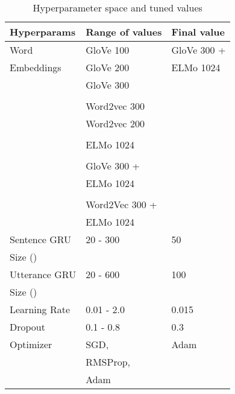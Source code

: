 \documentclass[11pt,a4paper]{article}
\begin{document}
\begin{table}[h]
\centering
\small 
\begin{tabular}{lll}
\hline \bf Hyperparams & \bf Range of values & \bf Final value \\ \hline
\hline
Word & GloVe 100 & GloVe 300 + \\ 
Embeddings & GloVe 200 & \hspace{3pt} ELMo 1024 \\
	& GloVe 300 \vspace{-5pt} & \\
	& \hrulefill \\
	& Word2vec 300 & \\
	& Word2vec 200 \vspace{-5pt} & \\
	& \hrulefill \\
	& ELMo 1024 \vspace{-5pt} & \\
	& \hrulefill \\
	& GloVe 300 + \\
	& \hspace{3pt} ELMo 1024 \vspace{-5pt} & \\
	& \hrulefill \\
	& Word2Vec 300 + \\
	& \hspace{3pt} ELMo 1024 & \\
\hline
Sentence GRU & 20 - 300 & 50 \\
Size () & & \\
\hline
Utterance GRU & 20 - 600 & 100 \\
Size () & & \\
\hline
Learning Rate & 0.01 - 2.0 & 0.015 \\
\hline
Dropout & 0.1 - 0.8 & 0.3 \\
\hline
Optimizer & SGD, & Adam \\
 & RMSProp, & \\
 & Adam & \\
\hline
\end{tabular}
\caption{\label{hyperparams} Hyperparameter space and tuned values}
\end{table}
\end{document}

